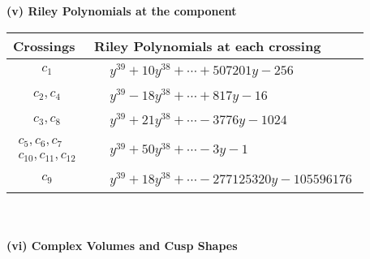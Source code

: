 \documentclass[1p]{elsarticle_modified}
\theoremstyle{definition}
\begin{document}
\newpage\renewcommand{\arraystretch}{1}
\flushleft \textbf{(v) Riley Polynomials at the component}\newline \\
\begin{tabular}{m{50pt}|m{274pt}}
Crossings & \hspace{64pt}Riley Polynomials at each crossing \\
\hline $$\begin{aligned}c_{1}\end{aligned}$$&$\begin{aligned}
&y^{39}+10 y^{38}+\cdots+507201 y-256
\end{aligned}$\\
\hline $$\begin{aligned}c_{2},c_{4}\end{aligned}$$&$\begin{aligned}
&y^{39}-18 y^{38}+\cdots+817 y-16
\end{aligned}$\\
\hline $$\begin{aligned}c_{3},c_{8}\end{aligned}$$&$\begin{aligned}
&y^{39}+21 y^{38}+\cdots-3776 y-1024
\end{aligned}$\\
\hline $$\begin{aligned}c_{5},c_{6},c_{7}\\c_{10},c_{11},c_{12}\end{aligned}$$&$\begin{aligned}
&y^{39}+50 y^{38}+\cdots-3 y-1
\end{aligned}$\\
\hline $$\begin{aligned}c_{9}\end{aligned}$$&$\begin{aligned}
&y^{39}+18 y^{38}+\cdots-277125320 y-105596176
\end{aligned}$\\
\hline
\end{tabular}\\~\\
\newpage\flushleft \textbf{(vi) Complex Volumes and Cusp Shapes}
\end{document}
